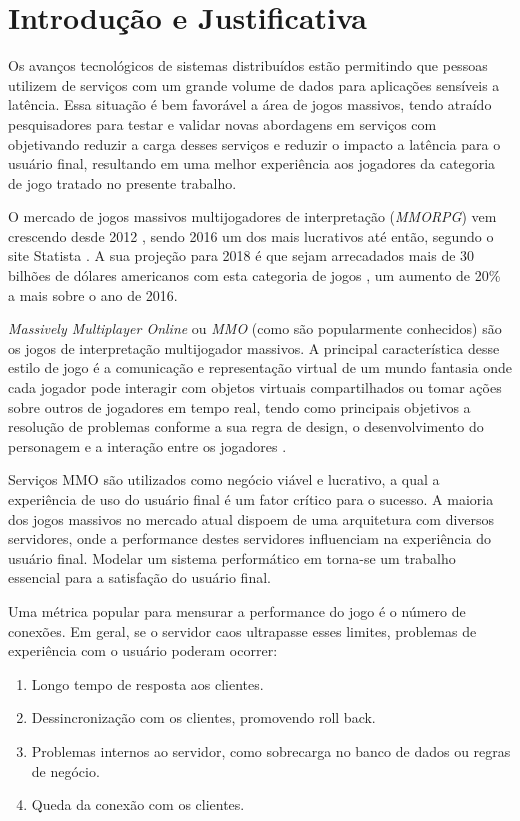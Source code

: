 \section{Introdução e Justificativa}
\label{sec:int}

Os avanços tecnológicos de sistemas distribuídos estão permitindo que pessoas utilizem de serviços com um grande volume de dados para aplicações sensíveis a latência. Essa situação é bem favorável a área de jogos massivos, tendo atraído pesquisadores para testar e validar novas abordagens em serviços com objetivando reduzir a carga desses serviços e reduzir o impacto a latência para o usuário final, resultando em uma melhor experiência aos jogadores da categoria de jogo tratado no presente trabalho\cite{mmo_analytic}.

O mercado de jogos massivos multijogadores de interpretação (\textit{MMORPG}) vem crescendo desde 2012 \cite{new_york_times}, sendo 2016 um dos mais lucrativos até então, segundo o site Statista \cite{statista_2016}. A sua projeção para 2018 é que sejam arrecadados mais de 30 bilhões de dólares americanos com esta categoria de jogos \cite{statista_2018}, um aumento de 20\% a mais sobre o ano de 2016.

\textit{Massively Multiplayer Online} ou \textit{MMO} (como são popularmente conhecidos) são os jogos de interpretação multijogador massivos. A principal característica desse estilo de jogo é a comunicação e representação virtual de um mundo fantasia onde cada jogador pode interagir com objetos virtuais compartilhados ou tomar ações sobre outros de jogadores em tempo real, tendo como principais objetivos a resolução de problemas conforme a sua regra de design, o desenvolvimento do personagem e a interação entre os jogadores \cite{video_game_technologies}.

Serviços MMO são utilizados como negócio viável e lucrativo, a qual a experiência de uso do usuário final é um fator crítico para o sucesso. A maioria dos jogos massivos no mercado atual dispoem de uma arquitetura com diversos servidores, onde a performance destes servidores influenciam na experiência do usuário final. Modelar um sistema performático em torna-se um trabalho essencial para a satisfação do usuário final\cite{1417630}.

Uma métrica popular para mensurar a performance do jogo é o número de conexões. Em geral, se o servidor caos ultrapasse esses limites, problemas de experiência com o usuário poderam ocorrer\cite{1417630}:

\begin{enumerate}
  \item Longo tempo de resposta aos clientes.
  \item Dessincronização com os clientes, promovendo roll back.
  \item Problemas internos ao servidor, como sobrecarga no banco de dados ou regras de negócio.
  \item Queda da conexão com os clientes.
\end{enumerate}

